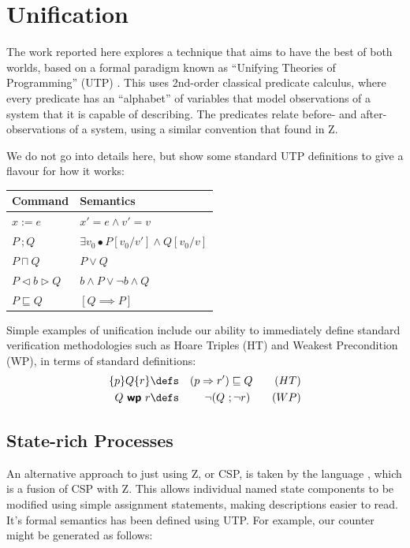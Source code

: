 \section{Unification}

The work reported here explores a technique that aims to have the best of both
worlds, based on a formal paradigm known
as ``Unifying Theories of Programming'' (UTP) \cite{UTP-book}.
This uses 2nd-order classical predicate calculus,
where every predicate has an ``alphabet'' of variables that
model observations of a system that it is capable of describing.
The predicates relate before- and after-observations of a system,
using a similar convention that found in Z.

We do not go into details here, but show some standard UTP definitions
to give a flavour for how it works:

\begin{tabular}{ll}
\hline
   \textbf{Command} & \textbf{Semantics}
\\\hline
     $x:=e$
   & $x'=e \land v'=v$
\\   $P~;Q$
   & $\exists v_0 \bullet P[v_0/v'] \land Q [v_0/v]$
\\   $P\sqcap Q$
   & $P\lor Q$
\\   $P \lhd b \rhd Q$
   & $b \land P \lor \lnot b \land Q$
\\   $P \sqsubseteq Q$
   & $[Q \implies P]$
\\\hline
\end{tabular}

Simple examples of unification include our ability to immediately define
standard verification methodologies such as
Hoare Triples (HT)
and Weakest Precondition (WP), in terms of standard definitions:
\begin{eqnarray*}
   \{p\} Q \{r\} &\defs& (p \implies r') \sqsubseteq Q \qquad (HT)
\\ Q ~\textbf{\textsf{wp}}~ r       &\defs& \lnot (Q ~;\lnot r) \qquad (WP)
\end{eqnarray*}


\subsection{State-rich Processes}

An alternative approach to just using Z, or CSP,
is taken by the language \Circus\cite{WC01,OCW2007},
which is a fusion of CSP with Z.
This allows individual named state components to be modified using simple
assignment statements, making descriptions easier to read.
It's formal semantics has been defined using UTP\cite{OCW2007}.
For example, our counter might be generated as follows:


